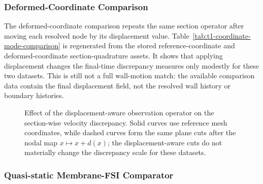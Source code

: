 \subsubsection{Deformed-Coordinate Comparison}
\label{subsec:deformed-coordinate-comparison}

The deformed-coordinate comparison repeats the same section operator after
moving each resolved node by its displacement value. Table~\ref{tab:t1-coordinate-mode-comparison}
is regenerated from the stored reference-coordinate and deformed-coordinate
section-quadrature assets. It shows that applying displacement changes the
final-time discrepancy measures only modestly for these two datasets. This is
still not a full wall-motion match: the available comparison data contain the
final displacement field, not the resolved wall history or boundary histories.

\begin{table}[!htb]
    \centering
    \scriptsize
    \caption{Reference-coordinate versus deformed-coordinate discrepancy
    measures for the same section observation operator. $D_{u,1}$ and $D_{u,2}$
    are the mean absolute and RMS section-mean velocity discrepancies in cm/s;
    $D_{Q,1}$ is the mean absolute physical-flow discrepancy in cm$^3$/s.
    Deformed-coordinate cuts alter the final metrics only modestly for these
    datasets.}
    \label{tab:t1-coordinate-mode-comparison}
    
\end{table}

\begin{figure}[!htb]
    \centering
    \captionsetup{aboveskip=2pt,belowskip=2pt}
    \caption{Effect of the displacement-aware observation operator on the
    section-wise velocity discrepancy. Solid curves use reference mesh
    coordinates, while dashed curves form the same plane cuts after the nodal
    map $x\mapsto x+d(x)$; the displacement-aware cuts do not materially change
    the discrepancy scale for these datasets.}
    \label{fig:t1-coordinate-mode-discrepancy}
\end{figure}

\subsubsection{Quasi-static Membrane-FSI Comparator}
\label{subsec:membrane-fsi-comparator}

